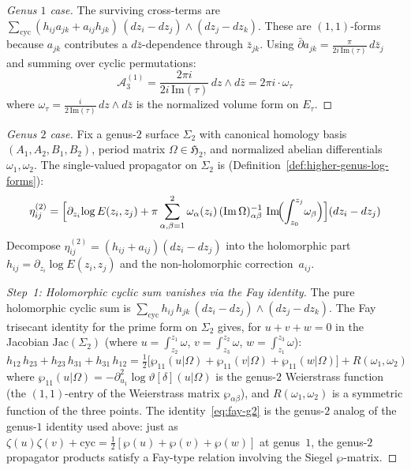 \begin{proof}[Genus $1$ case]
The surviving cross-terms are $\sum_{\mathrm{cyc}} (h_{ij} a_{jk} + a_{ij} h_{jk})\,(dz_i - dz_j) \wedge (dz_j - dz_k)$.  These are $(1,1)$-forms because $a_{jk}$ contributes a $d\bar{z}$-dependence through $\bar{z}_{jk}$.  Using $\bar\partial a_{jk} = \frac{\pi}{2i\,\mathrm{Im}(\tau)}\,d\bar{z}_j$ and summing over cyclic permutations:
\begin{equation}
\mathcal{A}_3^{(1)} = \frac{2\pi i}{2i\,\mathrm{Im}(\tau)} \, dz \wedge d\bar{z} = 2\pi i \cdot \omega_\tau
\end{equation}
where $\omega_\tau = \frac{i}{2\,\mathrm{Im}(\tau)}\,dz \wedge d\bar{z}$ is the normalized volume form on $E_\tau$.
\end{proof}

\begin{proof}[Genus $2$ case]
Fix a genus-$2$ surface $\Sigma_2$ with canonical homology basis
$(A_1, A_2, B_1, B_2)$, period matrix $\Omega \in \mathfrak{H}_2$,
and normalized abelian differentials $\omega_1, \omega_2$.
The single-valued propagator on $\Sigma_2$ is
(Definition~\ref{def:higher-genus-log-forms}):
\begin{equation}\label{eq:propagator-g2-full}
\eta_{ij}^{(2)} = \Bigl[\partial_{z_i}\!\log E(z_i, z_j)
  + \pi \sum_{\alpha,\beta=1}^{2}
  \omega_\alpha(z_i)\,(\operatorname{Im}\Omega)^{-1}_{\alpha\beta}\,
  \operatorname{Im}\!\Bigl(\int_{z_0}^{z_j}\!\omega_\beta\Bigr)
\Bigr](dz_i - dz_j)
\end{equation}
Decompose $\eta_{ij}^{(2)} = (h_{ij} + a_{ij})(dz_i - dz_j)$
into the holomorphic part
$h_{ij} = \partial_{z_i}\!\log E(z_i, z_j)$
and the non-holomorphic correction~$a_{ij}$.

\emph{Step~1: Holomorphic cyclic sum vanishes via the Fay identity.}
The pure holomorphic cyclic sum is
$\sum_{\mathrm{cyc}} h_{ij}\,h_{jk}\,(dz_i - dz_j) \wedge (dz_j - dz_k)$.
The Fay trisecant identity for the prime form on $\Sigma_2$ gives, for
$u + v + w = 0$ in the Jacobian $\mathrm{Jac}(\Sigma_2)$
(where $u = \int_{z_2}^{z_1}\!\omega$, $v = \int_{z_3}^{z_2}\!\omega$,
$w = \int_{z_1}^{z_3}\!\omega$):
\begin{equation}\label{eq:fay-g2}
h_{12}\,h_{23} + h_{23}\,h_{31} + h_{31}\,h_{12}
= \tfrac{1}{2}\bigl[\wp_{11}(u|\Omega) + \wp_{11}(v|\Omega)
  + \wp_{11}(w|\Omega)\bigr]
  + R(\omega_1, \omega_2)
\end{equation}
where $\wp_{11}(u|\Omega) = -\partial_{u_1}^2\!\log\vartheta[\delta](u|\Omega)$
is the genus-$2$ Weierstrass function (the $(1,1)$-entry of the
Weierstrass matrix $\wp_{\alpha\beta}$), and $R(\omega_1,\omega_2)$
is a symmetric function of the three points.
The identity~\eqref{eq:fay-g2} is the genus-$2$ analog
of the genus-$1$ identity used above: just as
$\zeta(u)\zeta(v) + \mathrm{cyc} = \frac{1}{2}[\wp(u) + \wp(v) + \wp(w)]$
at genus~$1$, the genus-$2$ propagator products satisfy a Fay-type
relation involving the Siegel $\wp$-matrix.


\end{proof}
